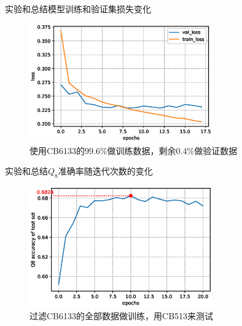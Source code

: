 \documentclass[table]{beamer}
\begin{document}
\begin{frame}{实验和总结}{模型训练和验证集损失变化}
\begin{figure}
	\centering
	\includegraphics[width=0.7\textwidth]{pic/loss.eps}
	\caption{使用CB6133的99.6\%做训练数据，剩余0.4\%做验证数据}
\end{figure}
\end{frame}


\begin{frame}{实验和总结}{$Q_8$准确率随迭代次数的变化}
\begin{figure}
	\centering
	\includegraphics[width=0.7\textwidth]{pic/val_q8.eps}
	\caption{过滤CB6133的全部数据做训练，用CB513来测试}
\end{figure}
\end{frame}
\end{document}
